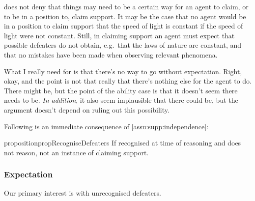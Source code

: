 \begin{note}
  \eiS{} does not deny that things may need to be a certain way for an agent to claim, or to be in a position to, claim support.
  It may be the case that no agent would be in a position to claim support that the speed of light is constant if the speed of light were not constant.
  Still, in claiming support an agent must expect that possible defeaters do not obtain, e.g.\ that the laws of nature are constant, and that no mistakes have been made when observing relevant phenomena.
\end{note}

{
  \color{blue}
  What I really need for \nI{} is that there's no way to go without expectation.
  Right, okay, and the point is not that really that there's nothing else for the agent to do.
  There might be, but the point of the ability case is that it doesn't seem there needs to be.
  \emph{In addition}, it also seem implausible that there could be, but the argument doesn't depend on ruling out this possibility.
}

\begin{note}
  Following is an immediate consequence of \autoref{assu:supp:independence}:

  \begin{restatable}{proposition}{propRecogniseDefeaters}\label{prop:CS-only-if-reason-recognised-defeaters}
    If recognised \requ{} at time of reasoning and does not reason, not an instance of claiming support.
  \end{restatable}

\end{note}

\subsubsection{Expectation}
\label{sec:claim-supp-expect}

\begin{note}
  Our primary interest is with unrecognised defeaters.
\end{note}

